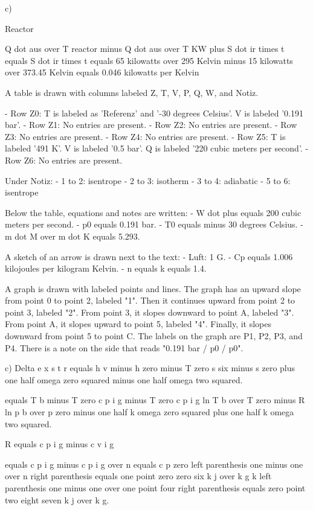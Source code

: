 c)  

Reactor  

Q dot aus over T reactor minus Q dot aus over T KW plus S dot ir times t  
equals S dot ir times t equals 65 kilowatts over 295 Kelvin minus 15 kilowatts over 373.45 Kelvin  
equals 0.046 kilowatts per Kelvin

A table is drawn with columns labeled Z, T, V, P, Q, W, and Notiz. 

- Row Z0: T is labeled as 'Referenz' and '-30 degrees Celsius'. V is labeled '0.191 bar'.
- Row Z1: No entries are present.
- Row Z2: No entries are present.
- Row Z3: No entries are present.
- Row Z4: No entries are present.
- Row Z5: T is labeled '491 K'. V is labeled '0.5 bar'. Q is labeled '220 cubic meters per second'.
- Row Z6: No entries are present.
  
Under Notiz:
- 1 to 2: isentrope
- 2 to 3: isotherm
- 3 to 4: adiabatic
- 5 to 6: isentrope

Below the table, equations and notes are written:
- W dot plus equals 200 cubic meters per second.
- p0 equals 0.191 bar.
- T0 equals minus 30 degrees Celsius.
- m dot M over m dot K equals 5.293.

A sketch of an arrow is drawn next to the text:
- Luft: 1 G.
- Cp equals 1.006 kilojoules per kilogram Kelvin.
- n equals k equals 1.4.

A graph is drawn with labeled points and lines. The graph has an upward slope from point 0 to point 2, labeled "1". Then it continues upward from point 2 to point 3, labeled "2". From point 3, it slopes downward to point A, labeled "3". From point A, it slopes upward to point 5, labeled "4". Finally, it slopes downward from point 5 to point C. The labels on the graph are P1, P2, P3, and P4. There is a note on the side that reads "0.191 bar / p0 / p0".

c) Delta e x s t r equals h v minus h zero minus T zero s six minus s zero plus one half omega zero squared minus one half omega two squared.

equals T b minus T zero c p i g minus T zero c p i g ln T b over T zero minus R ln p b over p zero minus one half k omega zero squared plus one half k omega two squared.

R equals c p i g minus c v i g

equals c p i g minus c p i g over n equals c p zero left parenthesis one minus one over n right parenthesis equals one point zero zero six k j over k g k left parenthesis one minus one over one point four right parenthesis equals zero point two eight seven k j over k g.

